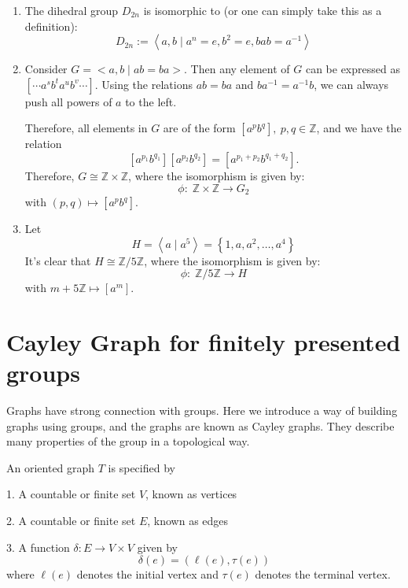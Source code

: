 \begin{example}
\begin{enumerate}
    \item The dihedral group $D_{2n}$ is isomorphic to (or one can simply take this as a definition):
\[
D_{2n} :=\left\langle  {a,b \mid  {a}^{n} = e,{b}^{2} = e,{bab} = {a}^{-1}}\right\rangle
\]
\item Consider \({G} =  < a,b \mid  {ab} = {ba} >\). Then any element of $G$ can be expressed as \([\cdots {a}^{s}{b}^{t}{a}^{u}{b}^{v}\cdots]\). Using the relations \({ab} = {ba}\) and $b{a}^{-1} = {a}^{-1}b$, we can always push all powers of \(a\) to the left.

Therefore, all elements in \({G}\) are of the form \([{a}^{p}{b}^{q}],\ p,q \in  \mathbb{Z}\), and we have the relation
\[
\left[ {{a}^{{p}_{1}}{b}^{{q}_{1}}}\right] \left[ {{a}^{{p}_{2}}{b}^{{q}_{2}}}\right] = [{a}^{{p}_{1} + {p}_{2}}{b}^{{q}_{1} + {q}_{2}}].
\]
Therefore, \({G} \cong  \mathbb{Z} \times  \mathbb{Z}\), where the isomorphism is given by:
\[
\phi  : \;\mathbb{Z} \times  \mathbb{Z} \rightarrow  {G}_{2}
\]
with \(\left( {p,q}\right)  \mapsto  [{a}^{p}{b}^{q}].\)

\item Let \[
H = \left\langle  {a \mid  {a}^{5}}\right\rangle   = \left\{  {1,a,{a}^{2},\ldots,{a}^{4}}\right\}
\]
It’s clear that \(H \cong  \mathbb{Z}/5\mathbb{Z}\), where the isomorphism is given by:
\[
\phi  : \;\mathbb{Z}/5\mathbb{Z} \rightarrow  H
\]
with \(m + 5\mathbb{Z} \mapsto  [{a}^{m}].\)
\end{enumerate}
\end{example}

\section{Cayley Graph for finitely presented groups}
Graphs have strong connection with groups. Here we introduce a way of building graphs using groups, and the graphs are known as Cayley graphs. They describe many properties of the group in a topological way.

\begin{definition}  An oriented graph \(T\) is specified by

1. A countable or finite set \(V\), known as vertices

2. A countable or finite set \(E\), known as edges

3. A function \(\delta  : E \rightarrow  V \times  V\) given by
\[
\delta \left( e\right)  = \left( {\ell \left( e\right),\tau \left( e\right) }\right)
\]
where \(\ell \left( e\right)\) denotes the initial vertex and \(\tau \left( e\right)\) denotes the terminal vertex.
\end{definition}

